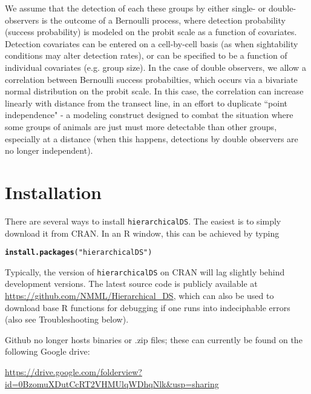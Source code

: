 \documentclass{article}\usepackage{graphicx, color}
\makeatletter
\newcommand{\hlfunctioncall}[1]{\textcolor[rgb]{0.501960784313725,0,0.329411764705882}{\textbf{#1}}}%
\newcommand{\hlstring}[1]{\textcolor[rgb]{0.6,0.6,1}{#1}}%
\newenvironment{kframe}{%
 \def\at@end@of@kframe{}%
 \ifinner\ifhmode%
  \def\at@end@of@kframe{\end{minipage}}%
  \begin{minipage}{\columnwidth}%
 \fi\fi%
 \def\FrameCommand##1{\hskip\@totalleftmargin \hskip-\fboxsep
 \colorbox{shadecolor}{##1}\hskip-\fboxsep
     \hskip-\linewidth \hskip-\@totalleftmargin \hskip\columnwidth}%
 \MakeFramed {\advance\hsize-\width
   \@totalleftmargin\z@ \linewidth\hsize
   \@setminipage}}%
 {\par\unskip\endMakeFramed%
 \at@end@of@kframe}
\newenvironment{knitrout}{}{} %
\makeatother
\begin{document}
We assume that the detection of each these groups by either single- or double-observers is the outcome of a Bernoulli process, where detection probability (success probability) is modeled on the probit scale as a function of covariates.  Detection covariates can be entered on a cell-by-cell basis (as when sightability conditions may alter detection rates), or can be specified to be a function of individual covariates (e.g. group size).  In the case of double observers, we allow a correlation between Bernoulli success probabilties, which occurs via a bivariate normal distribution on the probit scale.  In this case, the correlation can increase linearly with distance from the transect line, in an effort to duplicate ``point independence" \citep{BorchersEtAl2006,LaakeBorchers2004} - a modeling construct designed to combat the situation where some groups of animals are just must more detectable than other groups, especially at a distance (when this happens, detections by double observers are no longer independent). 


\section{Installation}

There are several ways to install \texttt{hierarchicalDS}.  The easiest is to simply download it from
CRAN.  In an R window, this can be achieved by typing

\begin{knitrout}
\color{fgcolor}\begin{kframe}
\begin{alltt}
\hlfunctioncall{install.packages}(\hlstring{"hierarchicalDS"})
\end{alltt}
\end{kframe}
\end{knitrout}


Typically, the version of \texttt{hierarchicalDS} on CRAN will lag slightly behind development versions.
The latest source code is publicly available at \url{https://github.com/NMML/Hierarchical_DS}, which
can also be used to download base R functions for debugging if one runs into indeciphable errors (also see Troubleshooting below). \vspace{.2in}

Github no longer hosts binaries or .zip files; these can currently be found on the following Google drive:

\url{https://drive.google.com/folderview?id=0BzomuXDutCcRT2VHMUlqWDhqNlk&usp=sharing}
\end{document}
